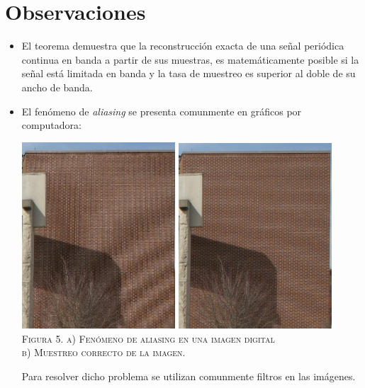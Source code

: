 \documentclass[a4paper]{article}
\begin{document}
\section{\sffamily Observaciones}
\begin{itemize}
\item El teorema demuestra que la reconstrucción exacta de una señal periódica continua en banda a partir de sus muestras, es matemáticamente posible si la señal está limitada en banda y la tasa de muestreo es superior al doble de su ancho de banda.

\item El fenómeno de \textit{aliasing} se presenta comunmente en gráficos por computadora:
\begin{center}
\includegraphics[width=0.45\textwidth]{bricks1}
\includegraphics[width=0.45\textwidth]{bricks2}\\
\textsc{Figura 5. a) Fenómeno de aliasing en una imagen digital \\b) Muestreo correcto de la imagen.}
\end{center}
Para resolver dicho problema se utilizan comunmente filtros en las imágenes.
\end{itemize}
\end{document}
